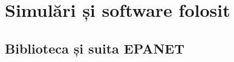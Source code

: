 \chapter{Simulări și software folosit}
\label{chap:simulari}

\section{Biblioteca și suita EPANET}


